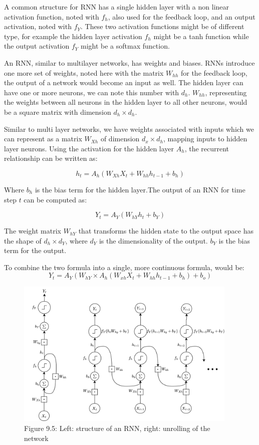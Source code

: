 A common structure for RNN has a single hidden layer with a non linear activation function, noted with \(f_h\), also used for the feedback loop, and an output activation, noted with \(f_Y\). These two activation functions might be of different type, for example the hidden layer activation \(f_h\) might be a tanh function while the output activation \(f_Y\) might be a softmax function.

An RNN, similar to multilayer networks, has weights and biases. RNNs introduce one more set of weights, noted here with the matrix \(W_{hh}\) for the feedback loop, the output of a network would become an input as well. The hidden layer can have one or more neurons, we can note this number with \(d_h\). \(W_{hh}\), representing the weights between all neurons in the hidden layer to all other neurons, would be a square matrix with dimension \(d_h \times d_h\).

Similar to multi layer networks, we have weights associated with inputs which we can represent as a matrix \(W_{Xh}\) of dimension \(d_x \times d_h\), mapping inputs to hidden layer neurons. Using the activation for the hidden layer \(A_h\), the recurrent relationship can be written as:

\[h_t = A_h(W_{Xh} X_t + W_{hh} h_{t-1} + b_h)\]

Where \(b_h\) is the bias term for the hidden layer.The output of an RNN for time step \(t\) can be computed as:

\[Y_t = A_Y(W_{hY} h_t + b_Y)\]

The weight matrix \(W_{hY}\) that transforms the hidden state to the output space has the shape of \(d_h \times d_Y\), where \(d_Y\) is the dimensionality of the output. \(b_Y\) is the bias term for the output.

To combine the two formula into a single, more continuous formula, would be:
\[Y_t = A_Y(W_{hY} \times A_h(W_{xh} X_t + W_{hh} h_{t-1} + b_h) + b_o)\]


\begin{figure}[htbp]
    \begin{center}
        \includegraphics[width=300pt]{../img/09-rnn.png}
        \caption{Figure 9.5:  Left: structure of an RNN, right: unrolling of the network}
    \end{center}
\end{figure}


